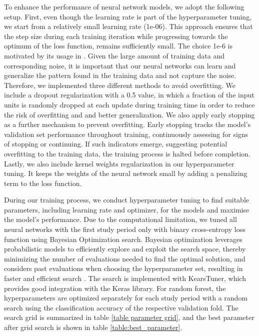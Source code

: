 \documentclass{article}
\begin{document}
To enhance the performance of neural network models, we adopt the following setup. First, even though the learning rate is part of the hyperparameter tuning, we start from a relatively small learning rate (1e-06). This approach ensures that the step size during each training iteration while progressing towards the optimum of the loss function, remains sufficiently small. The choice 1e-6 is motivated by its usage in \cite{fischer2018deep}. Given the large amount of training data and corresponding noise, it is important that our neural networks can learn and generalize the pattern found in the training data and not capture the noise. Therefore, we implemented three different methods to avoid overfitting. We include a dropout regularization with a 0.5 value, in which a fraction of the input units is randomly dropped at each update during training time in order to reduce the risk of overfitting and and better generalization. We also apply early stopping as a further mechanism to prevent overfitting. Early stopping tracks the model's validation set performance throughout training, continuously assessing for signs of stopping or continuing. If such indicators emerge, suggesting potential overfitting to the training data, the training process is halted before completion. Lastly, we also include kernel weights regularization in our hyperparameter tuning. It keeps the weights of the neural network small by adding a penalizing term to the loss function. 

During our training process, we conduct hyperparameter tuning to find suitable parameters, including learning rate and optimizer, for the models and maximise the model's performance. Due to the computational limitation, we tuned all neural networks with the first study period only with binary cross-entropy loss function using Bayesian Optimization search. Bayesian optimization leverages probabilistic models to efficiently explore and exploit the search space, thereby minimizing the number of evaluations needed to find the optimal solution, and considers past evaluations when choosing the hyperparameter set, resulting in faster and efficient search \citep{frazier2018tutorial}. The search is implemented with KearsTuner, which provides good integration with the Keras library. For random forest, the hyperparameters are optimized separately for each study period with a random search using the classification accuracy of the respective validation fold. The search grid is summarized in table \ref{table parameter grid}, and the best parameter after grid search is shown in table \ref{table:best_parameter}.
\end{document}
